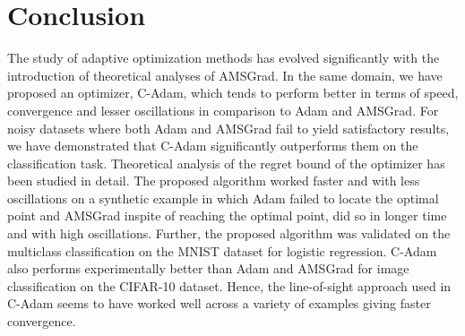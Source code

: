 \documentclass[12pt]{article}
\begin{document}
\section{Conclusion}\label{conclusion}
The study of adaptive optimization methods has evolved significantly with the introduction of theoretical analyses of AMSGrad. In the same domain, we have proposed an optimizer, C-Adam, which tends to perform better in terms of speed, convergence and lesser oscillations in comparison to Adam and AMSGrad. For noisy datasets where both Adam and AMSGrad fail to yield satisfactory results, we have demonstrated that C-Adam significantly outperforms them on the classification task. Theoretical analysis of the regret bound of the optimizer has been studied in detail. The proposed algorithm worked faster and with less oscillations on a synthetic example in which Adam failed to locate the optimal point and AMSGrad inspite of reaching the optimal point, did so in longer time and with high oscillations. Further, the proposed algorithm was validated on the multiclass classification on the MNIST dataset for logistic regression. C-Adam also performs experimentally better than Adam and AMSGrad for image classification on the CIFAR-10 dataset. Hence, the line-of-sight approach used in C-Adam seems to have worked well across a variety of examples giving faster convergence.






\end{document}
